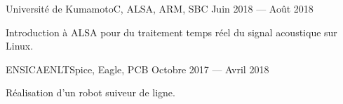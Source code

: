 \documentclass{faresume}
\begin{document}
\begin{column}[\leftcolumnwidth]
			{Universit\'e de Kumamoto}{C, ALSA, ARM, SBC}
			{Juin 2018 --- Ao\^ut 2018}
			{
				\begin{additems}
					\item Introduction \`a ALSA pour du traitement temps r\'eel du signal acoustique sur Linux.
				\end{additems}
			}

			{ENSICAEN}{LTSpice, Eagle, PCB}
			{Octobre 2017 --- Avril 2018}
			{
				\begin{additems}
					\item R\'ealisation d'un robot suiveur de ligne.
				\end{additems}
			}

\end{column}
\end{document}
